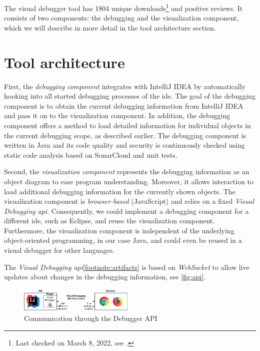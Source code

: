 \documentclass[conference]{IEEEtran}
\newcommand{\intellij}{IntelliJ IDEA}
\begin{document}

The visual debugger tool has 1804 unique downloads\footnote{\label{footnote:pluginStats}Last checked on March 8, 2022, see \cite{VisualDebuggerIntelliJ}.} and positive reviews.
It consists of two components: the debugging and the visualization component, which we will describe in more detail in the tool architecture section.

\section{Tool architecture}  \label{sec:architecture}
First, the \textit{debugging component} integrates with \intellij{} by automatically hooking into all started debugging processes of the \gls*{ide}.
The goal of the debugging component is to obtain the current debugging information from \intellij{} and pass it on to the visualization component.
In addition, the debugging component offers a method to load detailed information for individual objects in the current debugging scope, as described earlier.
The debugging component is written in Java and its code quality and security is continuously checked using static code analysis based on SonarCloud and unit tests.

Second, the \textit{visualization component} represents the debugging information as an object diagram to ease program understanding.
Moreover, it allows interaction to load additional debugging information for the currently shown objects.
The visualization component is \emph{browser-based} (JavaScript) and relies on a fixed \emph{Visual Debugging \gls*{api}}.
Consequently, we could implement a debugging component for a different \gls*{ide}, such as Eclipse, and reuse the visualization component.
Furthermore, the visualization component is independent of the underlying object-oriented programming, in our case Java, and could even be reused in a visual debugger for other  languages.

The \textit{Visual Debugging \gls*{api}}\cref{footnote:artifacts} is based on \emph{WebSocket} to allow live updates about changes in the debugging information, see \autoref{fig:api}.

\begin{figure}[h]
    \centering
    \includegraphics[width=0.488\textwidth]{images/VD-architecture.pdf}
    \caption{Communication through the Debugger API}
    \label{fig:api}
\end{figure}
\end{document}
